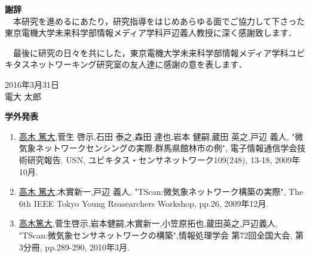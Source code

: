 \newpage

\begin{flushleft}
{\huge{\bf 謝辞}}\\
\vspace{1cm}
　本研究を進めるにあたり，研究指導をはじめあらゆる面でご協力して下さった東京電機大学未来科学部情報メディア学科戸辺義人教授に深く感謝致します．
\par
　最後に研究の日々を共にした，東京電機大学未来科学部情報メディア学科ユビキタスネットワーキング研究室の友人達に感謝の意を表します．\\

\vspace{3cm}
\begin{flushright}
2016年3月31日\\
電大 太郎\\
\end{flushright}
\end{flushleft}




\newpage



\begin{flushleft}
{\huge{\bf 学外発表}}\\
\vspace{1cm}
\begin{enumerate}
	
\item \underline{高木 篤大},菅生 啓示,石田 泰之,森田 達也,岩本 健嗣,蔵田 英之,戸辺 義人, "微気象ネットワークセンシングの実際:群馬県館林市の例", 電子情報通信学会技術研究報告. USN, ユビキタス・センサネットワーク109(248), 13-18, 2009年10月.
\item \underline{高木 篤大},木實新一,戸辺 義人, "TScan:微気象ネットワーク構築の実際", The 6th IEEE Tokyo Young Reasearchers Workshop, pp.26, 2009年12月.
\item \underline{高木篤大},菅生啓示,岩本健嗣,木實新一,小笠原拓也,蔵田英之,戸辺義人, "TScan:微気象センサネットワークの構築",情報処理学会 第72回全国大会, 第3分冊, pp.289-290, 2010年3月. 






\end{enumerate}
\end{flushleft}


